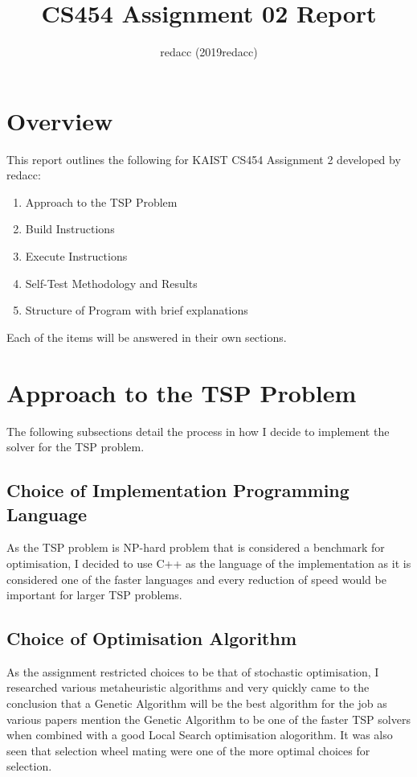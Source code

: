 \documentclass[12pt]{article}
\begin{document}
\title{CS454 Assignment 02 Report}
\author{redacc (2019redacc)}
\maketitle

\section{Overview}
This report outlines the following for KAIST CS454 Assignment 2 developed by redacc:

\begin{enumerate}
	\item Approach to the TSP Problem
	\item Build Instructions
	\item Execute Instructions
	\item Self-Test Methodology and Results
	\item Structure of Program with brief explanations
\end{enumerate}

Each of the items will be answered in their own sections.

\section{Approach to the TSP Problem}
The following subsections detail the process in how I decide to implement the solver for the TSP problem.

\subsection{Choice of Implementation Programming Language}
As the TSP problem is NP-hard problem that is considered a benchmark for optimisation, I decided to use C++ as the language of the implementation as it is considered one of the faster languages and every reduction of speed would be important for larger TSP problems.

\subsection{Choice of Optimisation Algorithm}
As the assignment restricted choices to be that of stochastic optimisation, I researched various metaheuristic algorithms and very quickly came to the conclusion that a Genetic Algorithm will be the best algorithm for the job as various papers mention the Genetic Algorithm to be one of the faster TSP solvers when combined with a good Local Search optimisation alogorithm. It was also seen that selection wheel mating were one of the more optimal choices for selection.
\end{document}
